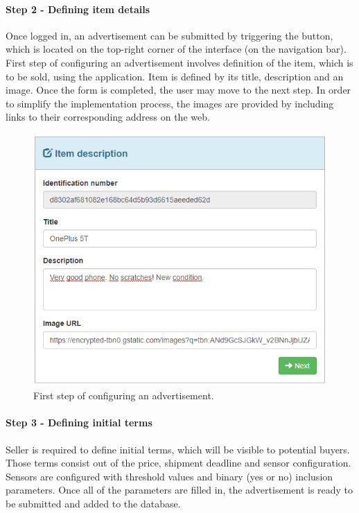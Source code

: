 \paragraph{Step 2 - Defining item details}

Once logged in, an advertisement can be submitted by triggering the button, which is located on the top-right corner of the interface (on the navigation bar). First step of configuring an advertisement involves definition of the item, which is to be sold, using the application. Item is defined by its title, description and an image. Once the form is completed, the user may move to the next step. In order to simplify the implementation process, the images are provided by including links to their corresponding address on the web.

\begin{figure}[H]
\centering
\includegraphics[scale=0.48]{app_screens/new_item_1.png}
\caption{First step of configuring an advertisement.}
\label{fig:newitem1}
\end{figure}

\paragraph{Step 3 - Defining initial terms}

Seller is required to define initial terms, which will be visible to potential buyers. Those terms consist out of the price, shipment deadline and sensor configuration. Sensors are configured with threshold values and binary (yes or no) inclusion parameters. Once all of the parameters are filled in, the advertisement is ready to be submitted and added to the database.

